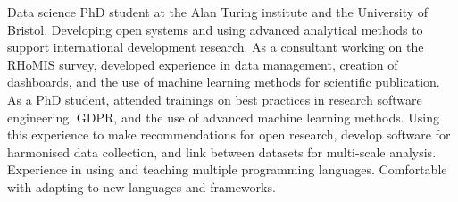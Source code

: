 \documentclass[letter,10pt]{article}
\begin{document}
Data science PhD student at the Alan Turing institute and the University of Bristol.  Developing open systems and using advanced analytical methods to support international development research. 
As a consultant working on the RHoMIS survey, developed experience in data management, creation of dashboards, and the use of machine learning methods for scientific publication. 
As a PhD student, attended trainings on best practices in research software engineering, GDPR, and the use of advanced machine learning methods. Using this experience to make recommendations for open research, develop software for harmonised data collection, and link between datasets for multi-scale analysis.
Experience in using and teaching multiple programming languages. Comfortable with adapting to new languages and frameworks.
\end{document}
